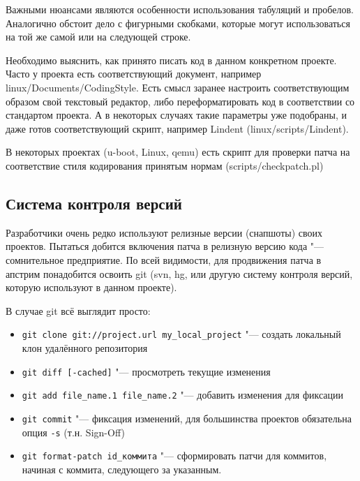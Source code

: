 \documentclass[10pt, a5paper]{article}
\begin{document}
Важными нюансами являются особенности использования табуляций и пробелов. Аналогично обстоит дело с фигурными скобками, которые могут использоваться на той же самой или на следующей строке.

Необходимо выяснить, как принято писать код в данном конкретном проекте. Часто у проекта есть соответствующий документ, например linux/Documents/CodingStyle. Есть смысл заранее настроить соответствующим образом свой текстовый редактор, либо переформатировать код в соответствии со стандартом проекта. А в некоторых случаях такие параметры уже подобраны, и даже готов соответствующий скрипт, например Lindent (linux/scripts/Lindent).

В некоторых проектах (u-boot, Linux, qemu) есть скрипт для проверки патча на соответствие стиля кодирования принятым нормам (scripts/checkpatch.pl)

\subsection*{Система контроля версий}

Разработчики очень редко используют релизные версии (снапшоты) своих проектов. Пытаться добится включения патча в релизную версию кода "--- сомнительное предприятие. По всей видимости, для продвижения патча в апстрим понадобится освоить git (svn, hg, или другую систему контроля версий, которую используют в данном проекте).

В случае git всё выглядит просто:

\begin{itemize}
  \item  \verb!git clone git://project.url my_local_project! "--- создать \linebreak локальный клон удалённого репозитория
  \item  \verb!git diff [-cached]! "--- просмотреть текущие \linebreak [добавленные] изменения
  \item  \verb!git add file_name.1 file_name.2! "--- добавить изменения для фиксации
  \item  \verb!git commit! "--- фиксация изменений, для большинства проектов обязательна опция \verb!-s! (т.н. Sign-Off)
  \item  \verb!git format-patch id_коммита! "--- сформировать патчи для \linebreak коммитов, начиная с коммита, следующего за указанным.
\end{itemize}
\end{document}
